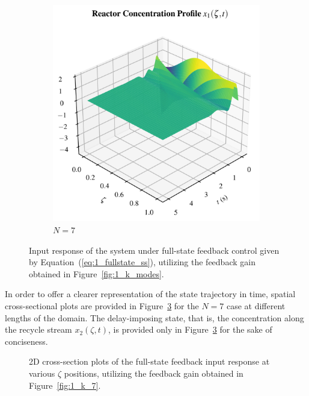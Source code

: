 \begin{figure}[!htbp]
\begin{subfigure}[t]{0.49\textwidth}
        \includegraphics[width=\textwidth%
        ]{papers/1_optimal/figures/3D_x1_k7.png}
        \caption{$N=7$}
        \label{fig:1_3D_x1_k7}
    \end{subfigure}
    \caption{Input response of the system under full-state feedback control given by Equation~(\ref{eq:1_fullstate_ss}), utilizing the feedback gain obtained in Figure~\ref{fig:1_k_modes}.}
    \label{fig:1_full_state_feedback}
\end{figure}

In order to offer a clearer representation of the state trajectory in time, spatial cross-sectional plots are provided in Figure~\ref{fig:1_2D_xt_k7} for the $N=7$ case at different lengths of the domain. The delay-imposing state, that is, the concentration along the recycle stream $x_2(\zeta,t)$, is provided only in Figure~\ref{fig:1_2D_xt_k7} for the sake of conciseness.

\begin{figure}[!htbp]
    \centering
    
    \caption{2D cross-section plots of the full-state feedback input response at various $\zeta$ positions, utilizing the feedback gain obtained in Figure~\ref{fig:1_k_7}.}
    \label{fig:1_2D_xt_k7}
\end{figure}

